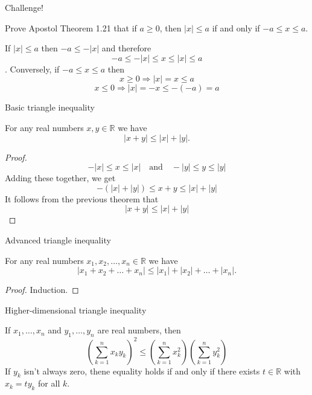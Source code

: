 \documentclass{beamer}
\begin{document}
\begin{frame}{Challenge!}
\begin{prob}
Prove Apostol Theorem 1.21 that if $a\geq 0$, then $\lvert x\rvert \leq a$ if and only if $-a\leq x\leq a$.
\end{prob}
\begin{soln}
If $\lvert x\rvert \leq a$ then $-a\leq -\lvert x\rvert$
\pause 
and therefore
$$-a\leq -\lvert x\rvert \leq x\leq \lvert x\rvert\leq a$$.
\pause 
Conversely, if $-a\leq x\leq a$ then
\pause 
$$x\geq 0\Rightarrow \lvert x\rvert = x\leq a$$
\pause 
$$x\leq 0\Rightarrow \lvert x\rvert = -x\leq -(-a) = a$$
\end{soln}
\end{frame}

\begin{frame}{Basic triangle inequality}
\begin{thm}
For any real numbers $x,y\in\mathbb{R}$ we have
$$\lvert x+y\rvert\leq \lvert x \rvert + \lvert y\rvert.$$
\end{thm}
\begin{proof}
$$
-\lvert x \rvert \leq x\leq \lvert x\rvert
\quad\text{and}\quad
-\lvert y \rvert \leq y\leq \lvert y\rvert
$$
\pause
Adding these together, we get
$$
-(\lvert x \rvert + \lvert y \rvert) \leq x + y\leq \lvert x\rvert + \lvert y\rvert
$$
\pause
It follows from the previous theorem that
$$\lvert x + y\rvert \leq \lvert x\rvert + \lvert y\rvert$$
\end{proof}
\end{frame}

\begin{frame}{Advanced triangle inequality}
\begin{thm}
For any real numbers $x_1,x_2,\dots,x_n\in\mathbb{R}$ we have
$$\lvert x_1+x_2+\dots+x_n\rvert\leq \lvert x_1 \rvert + \lvert x_2\rvert +  \dots + \lvert x_n\rvert.$$
\end{thm}
\pause
\begin{proof}
Induction.
\end{proof}
\end{frame}

\begin{frame}{Higher-dimensional triangle inequality}
\begin{thm}
If $x_1,\dots,x_n$ and $y_1,\dots, y_n$ are real numbers, then
$$\left(\sum_{k=1}^n x_ky_k\right)^2\leq \left(\sum_{k=1}^n x_k^2\right)\left(\sum_{k=1}^n y_k^2\right)$$
If $y_k$ isn't always zero, thene equality holds if and only if there exists $t\in\mathbb{R}$ with $x_k = ty_k$ for all $k$.
\end{thm}
\end{frame}
\end{document}
